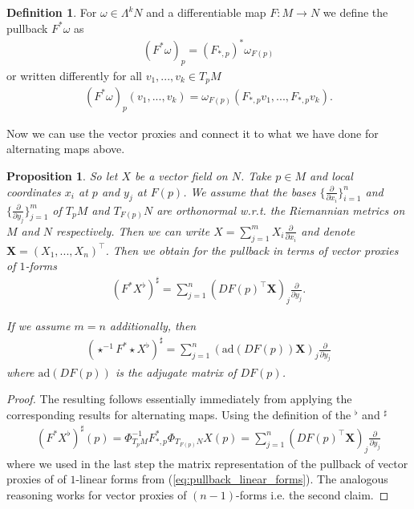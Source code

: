 \documentclass[12pt,a4paper]{article}
\numberwithin{equation}{subsection}
\numberwithin{lemma}{subsection}
\newtheorem{proposition}[lemma]{Proposition}
\theoremstyle{definition}
\newtheorem{definition}[lemma]{Definition}
\begin{document}
\begin{definition}
    For $\omega \in \Lambda^k N$ and a differentiable map $F:M \rightarrow N$ 
    we define the pullback $F^*\omega$ as
    \begin{align*}
        (F^*\omega)_p = (F_{*,p})^* \omega_{F(p)}
    \end{align*}
    or written differently for all $v_1,...,v_k \in T_p M$
    \begin{align*}
        (F^*\omega)_p (v_1,...,v_k) = \omega_{F(p)}(F_{*,p} v_1, ..., F_{*,p} v_k).
    \end{align*}
\end{definition}
Now we can use the vector proxies and connect it to what we have done 
for alternating maps above. 

\begin{proposition}
    So let $X$ be a vector field on $N$. Take $p \in M$ and local coordinates
    $x_i$ at $p$ and $y_j$ at $F(p)$. We assume that the bases
    $\{ \frac{\partial}{\partial x_i} \}_{i=1}^n$ and 
    $\{ \frac{\partial}{\partial y_j} \}_{j=1}^m$ of $T_p M$ and $T_{F(p)} N$ 
    are orthonormal w.r.t. the Riemannian metrics
    on $M$ and $N$ respectively. 
    Then we can write $X = \sum_{j=1}^m X_i \frac{\partial}{\partial x_i}$
    and denote $\mathbf{X} = (X_1,..., X_n)^\top$.
    Then we obtain for the pullback in terms of
    vector proxies of $1$-forms
    \begin{align*}
        (F^* X^\flat)^\sharp 
        = \sum_{j=1}^n (DF(p)^\top \mathbf{X})_j \frac{\partial}{\partial y_j}.
    \end{align*}

    If we assume $m=n$ additionally, then 
    \begin{align*}
        (\star^{-1} F^* \star X^\flat)^\sharp 
        = \sum_{j=1}^n (\text{ad}(DF(p)) \mathbf{X})_j \frac{\partial}{\partial y_j}
    \end{align*}
    where $\text{ad}(DF(p))$ is the adjugate matrix of $DF(p)$.
\end{proposition}
\begin{proof}
    The resulting follows essentially immediately from applying the 
    corresponding results for alternating maps. Using the definition of 
    the $^\flat$ and $^\sharp$
    \begin{align*}
        (F^* X^\flat)^\sharp(p)
        = \Phi^{-1}_{T_p M} F_{*,p}^* \Phi_{T_{F(p)}N} X(p)
        = \sum_{j=1}^n (DF(p)^\top \mathbf{X})_j \frac{\partial}{\partial y_j}
    \end{align*}
    where we used in the last step the matrix representation of the pullback of vector proxies of
    of $1$-linear forms from (\ref{eq:pullback_linear_forms}). The analogous reasoning works 
    for vector proxies of $(n-1)$-forms i.e. the second claim.
\end{proof}
\end{document}
